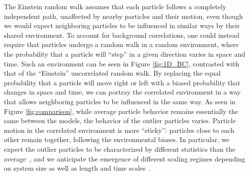 The Einstein random walk assumes that each particle follows a completely independent path, unaffected by nearby particles and their motion, even though we would expect neighboring particles to be influenced in similar ways by their shared environment.
To account for background correlations, one could instead require that particles undergo a random walk in a random environment, where the probability that a particle will ``step'' in a given direction varies in space and time. Such an environment can be seen in Figure \ref{fig:1D_BC}, contrasted with that of the ``Einstein'' uncorrelated random walk. By replacing the equal probability that a particle will move right or left with a biased probability that changes in space and time, we can portray the correlated environment in a way that allows neighboring particles to be influenced in the same way.
As seen in Figure \ref{fig:comparison}, while average particle behavior remains essentially the same between the models, the behavior of the outlier particles varies. Particle motion in the correlated environment is more ``sticky'': particles close to each other remain together, following the environmental biases. In particular, we expect the outlier particles to be characterized by different statistics than the average~\cite{lawley_distribution_2020,lawley_probabilistic_2020,lawley_universal_2020}, and we  anticipate the emergence of different scaling regimes depending on system size as well as length and time scales~\cite{barraquand_random-walk_2017,le_doussal_diffusion_2017}.


